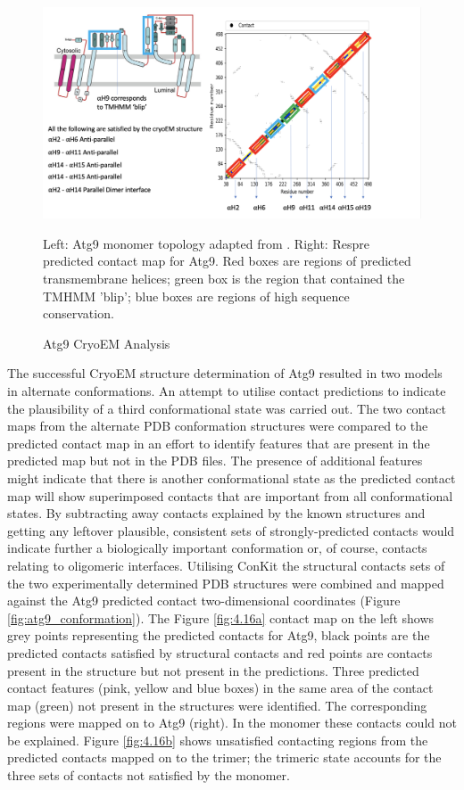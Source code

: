 \begin{figure}[th!]
    \centering
    \includegraphics[width=\linewidth]{Modelling of Atg9/h_res_cro_anal1.png}
    \caption{Atg9 CryoEM Analysis}
    \label{fig:croem_anal1}
    \small
    Left: Atg9 monomer topology adapted from \cite{guardia2020structure}. Right: Respre predicted contact map for Atg9. Red boxes are regions of predicted transmembrane helices; green box is the region that contained the TMHMM 'blip'; blue boxes are regions of high sequence conservation.
    
\end{figure}

The successful CryoEM structure determination of Atg9 resulted in two models in alternate conformations.  An attempt to utilise contact predictions to indicate the plausibility of a third conformational state was carried out. The two contact maps from the alternate PDB conformation structures were compared to the predicted contact map in an effort to identify features that are present in the predicted map but not in the PDB files.  The presence of additional features might indicate that there is another conformational state as the predicted contact map will show superimposed contacts that are important from all conformational states. By subtracting away contacts explained by the known structures and getting any leftover plausible, consistent sets of strongly-predicted contacts would indicate further a biologically important conformation or, of course, contacts relating to oligomeric interfaces. Utilising ConKit the structural contacts sets of the two experimentally determined PDB structures were combined and mapped against the Atg9  predicted contact two-dimensional coordinates (Figure \ref{fig:atg9_conformation}). The Figure \ref{fig:4.16a} contact map on the left shows grey points representing the predicted contacts for Atg9, black points are the predicted contacts satisfied by structural contacts and red points are contacts present in the structure but not present in the predictions.  Three predicted contact features (pink, yellow and blue boxes) in the same area of the contact map (green) not present in the structures were identified. The corresponding regions were mapped on to Atg9 (right).  In the monomer these contacts could not be explained. Figure \ref{fig:4.16b} shows unsatisfied contacting regions from the predicted contacts mapped on to the trimer; the trimeric state accounts for the three sets of contacts not satisfied by the monomer.

